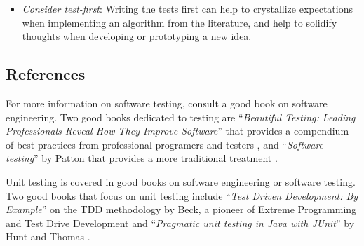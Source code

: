 \begin{itemize}
	\item \emph{Consider test-first}: Writing the tests first can help to crystallize expectations when implementing an algorithm from the literature, and help to solidify thoughts when developing or prototyping a new idea.
\end{itemize}

% 
% 
\subsection{References}
For more information on software testing, consult a good book on software engineering. Two good books dedicated to testing are ``\emph{Beautiful Testing: Leading Professionals Reveal How They Improve Software}'' that provides a compendium of best practices from professional programers and testers \cite{Goucher2009}, and ``\emph{Software testing}'' by Patton that provides a more traditional treatment \cite{Patton2005}.

Unit testing is covered in good books on software engineering or software testing.
Two good books that focus on unit testing include ``\emph{Test Driven Development: By Example}'' on the TDD methodology by Beck, a pioneer of Extreme Programming and Test Drive Development \cite{Beck2002} and ``\emph{Pragmatic unit testing in Java with JUnit}'' by Hunt and Thomas \cite{Hunt2003}.


